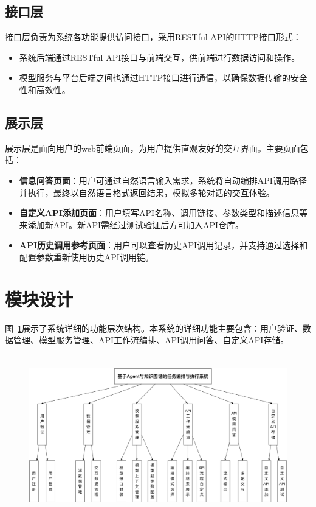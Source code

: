 \subsection{接口层}

接口层负责为系统各功能提供访问接口，采用RESTful API的HTTP接口形式：
\begin{itemize}
    \item 系统后端通过RESTful API接口与前端交互，供前端进行数据访问和操作。
    \item 模型服务与平台后端之间也通过HTTP接口进行通信，以确保数据传输的安全性和高效性。
\end{itemize}

\subsection{展示层}

展示层是面向用户的web前端页面，为用户提供直观友好的交互界面。主要页面包括：
\begin{itemize}
    \item \textbf{信息问答页面}：用户可通过自然语言输入需求，系统将自动编排API调用路径并执行，最终以自然语言格式返回结果，模拟多轮对话的交互体验。
    \item \textbf{自定义API添加页面}：用户填写API名称、调用链接、参数类型和描述信息等来添加新API。新API需经过测试验证后方可加入API仓库。
    \item \textbf{API历史调用参考页面}：用户可以查看历史API调用记录，并支持通过选择和配置参数重新使用历史API调用链。
\end{itemize}

\section{模块设计}

图~\ref{fig:module}展示了系统详细的功能层次结构。本系统的详细功能主要包含：用户验证、数据管理、模型服务管理、API工作流编排、API调用问答、自定义API存储。

\begin{figure}[H]
  \vspace{1em}
  \centering
  \setlength{\abovecaptionskip}{10pt} %
  \includegraphics[height=7cm]{../assets/ch5-系统模块图.pdf}
  \label{fig:module}
\end{figure}

